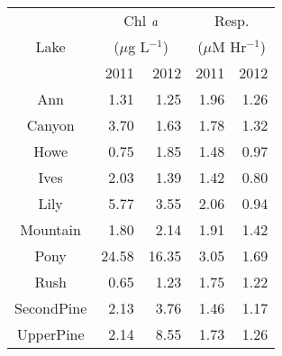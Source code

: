 \begin{table}[ht]
\centering
\begin{tabular}{c r r r r }
  \hline
\hline
   & \multicolumn{2}{c}{Chl $\emph{a}$} & 
                      \multicolumn{2}{c}{Resp.} \\
 Lake & \multicolumn{2}{c}{($\mu$g L$^{-1}$)} & 
                      \multicolumn{2}{c}{($\mu$M Hr$^{-1}$)} \\
  & 2011 & 2012 & 2011 & 2012 \\
 \hline
Ann & 1.31 & 1.25 & 1.96 & 1.26 \\ 
  Canyon & 3.70 & 1.63 & 1.78 & 1.32 \\ 
  Howe & 0.75 & 1.85 & 1.48 & 0.97 \\ 
  Ives & 2.03 & 1.39 & 1.42 & 0.80 \\ 
  Lily & 5.77 & 3.55 & 2.06 & 0.94 \\ 
  Mountain & 1.80 & 2.14 & 1.91 & 1.42 \\ 
  Pony & 24.58 & 16.35 & 3.05 & 1.69 \\ 
  Rush & 0.65 & 1.23 & 1.75 & 1.22 \\ 
  SecondPine & 2.13 & 3.76 & 1.46 & 1.17 \\ 
  UpperPine & 2.14 & 8.55 & 1.73 & 1.26 \\ 
   \hline
\end{tabular}
\end{table}
